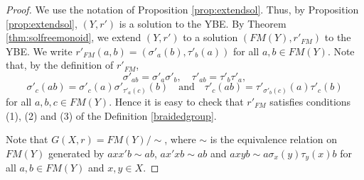 \begin{proof}
We use the notation of Proposition \ref{prop:extendsol}. Thus, by Proposition \ref{prop:extendsol}, $(Y,r')$ is a solution to the YBE. By Theorem \ref{thm:solfreemonoid}, we extend $(Y,r')$ to a solution $(FM(Y),r'_{FM})$ to the YBE. We write $r'_{FM}(a,b)=(\sigma'_a(b),\tau'_b(a))$ for all $a,b\in FM(Y)$. Note that, by the definition of $r'_{FM}$,
\[\sigma'_{ab}=\sigma'_a\sigma'_b,\quad \tau'_{ab}=\tau'_b\tau'_a,\]
\[\sigma'_c(ab)=\sigma'_c(a)\sigma'_{\tau'_a(c)}(b)\quad\text{and}\quad
\tau'_c(ab)=\tau'_{\sigma'_b(c)}(a)\tau'_c(b)\]
for all $a,b,c\in FM(Y)$. Hence it is easy to check that $r'_{FM}$ satisfies conditions (1), (2) and (3) of the Definition \ref{braidedgroup}. 

Note that $G(X,r)=FM(Y)/\sim$, where $\sim$ is the equivalence relation on $FM(Y)$ generated by $axx'b\sim ab$, $ax'xb\sim ab$ and $axyb\sim a\sigma_x(y)\tau_y(x)b$ for all $a,b\in FM(Y)$ and $x,y\in X$.


\end{proof}
